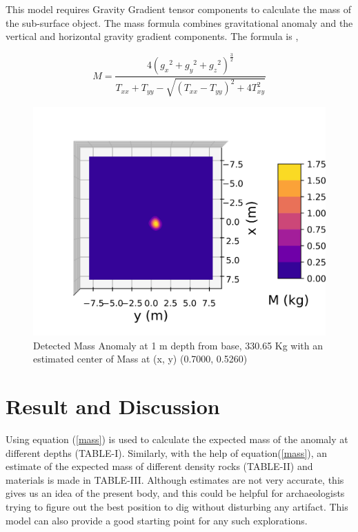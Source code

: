 \documentclass[a4paper,11pt]{article}
\begin{document}
 This model requires  Gravity Gradient tensor components to calculate the mass of the sub-surface object. The mass formula combines gravitational anomaly and the vertical and horizontal gravity gradient components. The formula is \cite{tang2017analytical},

\begin{equation}\label{mass}
 M=\frac{4({g_x}^2+{g_y}^2+{g_z}^2)^\frac{3}{2}}{T_{xx}+T_{yy}-\sqrt{(T_{xx}-T_{yy})^2+4T_{xy}^2}}
\end{equation}

\begin{figure}[H]
    \centering
    \includegraphics[scale=0.8]{plots/mass_anomaly.png}
    \caption{Detected Mass Anomaly at 1 m depth from base, 330.65 Kg with an estimated center of Mass at (x, y) (0.7000, 0.5260) }
\end{figure}

\section{Result and Discussion}

Using equation (\ref{mass}) is used to calculate the expected mass of the anomaly at different depths {(TABLE-I)}. Similarly, with the help of equation(\ref{mass}), an estimate of the expected mass of different density rocks (TABLE-II) and materials is made in TABLE-III. 
Although estimates are not very accurate, this gives us an idea of the present body, and this could be helpful for archaeologists trying to figure out the best position to dig without disturbing any artifact. This model can also provide a good starting point for any such explorations.\\
\end{document}
